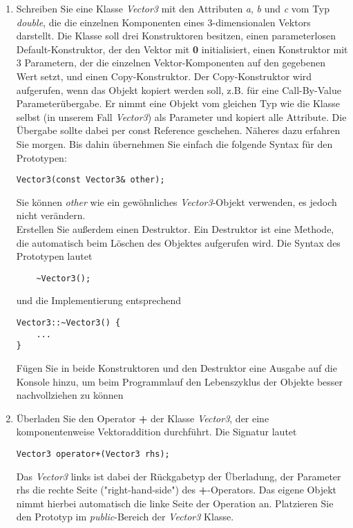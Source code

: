 \documentclass[
  accentcolor=tud1c,	%
  colorbacktitle,		%
  inverttitle,			%
  german,				%
  twoside
]{tudexercise}
\begin{document}
\begin{enumerate}
\item 
Schreiben Sie eine Klasse \emph{Vector3} mit den Attributen \emph{a}, \emph{b} und \emph{c} vom Typ \emph{double}, die die einzelnen Komponenten eines 3-dimensionalen Vektors darstellt. Die Klasse soll drei Konstruktoren besitzen, einen parameterlosen Default-Konstruktor, der den Vektor mit \textbf{0} initialisiert, einen Konstruktor mit 3 Parametern, der die einzelnen Vektor-Komponenten auf den gegebenen Wert setzt, und einen Copy-Konstruktor. Der Copy-Konstruktor wird aufgerufen, wenn das Objekt kopiert werden soll, z.B. für eine Call-By-Value Parameterübergabe. Er nimmt eine Objekt vom gleichen Typ wie die Klasse selbst (in unserem Fall \emph{Vector3}) als Parameter und kopiert alle Attribute. Die Übergabe sollte dabei per const Reference geschehen. Näheres dazu erfahren Sie morgen. Bis dahin übernehmen Sie einfach die folgende Syntax für den Prototypen:
\begin{lstlisting}
Vector3(const Vector3& other);
\end{lstlisting} 

Sie können \emph{other} wie ein gewöhnliches \emph{Vector3}-Objekt verwenden, es jedoch nicht verändern. \\

Erstellen Sie außerdem einen Destruktor. Ein Destruktor ist eine Methode, die automatisch beim Löschen des Objektes aufgerufen wird. Die Syntax des Prototypen lautet
\begin{lstlisting}
	~Vector3();
\end{lstlisting} 

und die Implementierung entsprechend
\begin{lstlisting}
Vector3::~Vector3() {
	...
}
\end{lstlisting} 

Fügen Sie in beide Konstruktoren und den Destruktor eine Ausgabe auf die Konsole hinzu, um beim Programmlauf den Lebenszyklus der Objekte besser nachvollziehen zu können

\item
Überladen Sie den Operator \textbf{+} der Klasse \emph{Vector3}, der eine komponentenweise Vektoraddition durchführt. Die Signatur lautet
\begin{lstlisting}
Vector3 operator+(Vector3 rhs);
\end{lstlisting}
Das \emph{Vector3} links ist dabei der Rückgabetyp der Überladung, der Parameter rhs die rechte Seite ("{}right-hand-side"{}) des \textbf{+}-Operators. Das eigene Objekt nimmt hierbei automatisch die linke Seite der Operation an. Platzieren Sie den Prototyp im \emph{public}-Bereich der \emph{Vector3} Klasse.


\end{enumerate}
\end{document}
